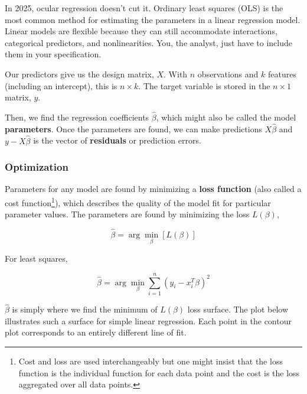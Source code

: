 In 2025, ocular regression doesn't cut it. Ordinary least squares (OLS) is the most common method for estimating the parameters in a linear regression model. Linear models are flexible because they can still accommodate interactions, categorical predictors, and nonlinearities. You, the analyst, just have to include them in your specification.

Our predictors give us the design matrix, $X$. With $n$ observations and $k$ features (including an intercept), this is $n\times k$. The target variable is stored in the $n\times 1$ matrix, $y$.

Then, we find the regression coefficients $\hat{\beta}$, which might also be called the model \textbf{parameters}. Once the parameters are found, we can make predictions $X\hat{\beta}$ and $y-X \hat{\beta}$ is the vector of \textbf{residuals} or prediction errors.

\subsubsection{Optimization}

Parameters for any model are found by minimizing a \textbf{loss function} (also called a cost function\footnote{Cost and loss are used interchangeably but one might insist that the loss function is the individual function for each data point and the cost is the loss aggregated over all data points.}), which describes the quality of the model fit for particular parameter values. The parameters are found by minimizing the loss $L(\beta)$,

\begin{equation}
\hat{\beta} = \arg\min_{\beta} \left[ L(\beta) \right]
\label{eq:general-optimization}
\end{equation}

For least squares,

\begin{equation}
\hat{\beta} = \arg\min_{\beta} \sum_{i=1}^n (y_i - x_i^T\beta)^2
\label{eq:ols-optimization}
\end{equation}

$\hat{\beta}$ is simply where we find the minimum of $L(\beta)$ loss surface. The plot below illustrates such a surface for simple linear regression. Each point in the contour plot corresponds to an entirely different line of fit.

